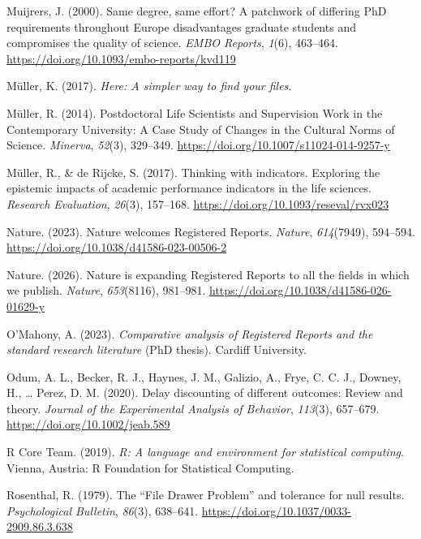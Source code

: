 \documentclass[
  british,
  a4paper,
  ,man,floatsintext]{apa6}
\newlength{\cslhangindent}
\newenvironment{CSLReferences}[2] %
 {\begin{list}{}{%
  \setlength{\itemindent}{0pt}
  \setlength{\leftmargin}{0pt}
  \setlength{\parsep}{0pt}
  \ifodd #1
   \setlength{\leftmargin}{\cslhangindent}
   \setlength{\itemindent}{-1\cslhangindent}
  \fi
  \setlength{\itemsep}{#2\baselineskip}}}
 {\end{list}}
\begin{document}
\begin{CSLReferences}{1}{0}
Muijrers, J. (2000). Same degree, same effort? {A} patchwork of differing {PhD} requirements throughout {Europe} disadvantages graduate students and compromises the quality of science. \emph{EMBO Reports}, \emph{1}(6), 463--464. \url{https://doi.org/10.1093/embo-reports/kvd119}

Müller, K. (2017). \emph{Here: {A} simpler way to find your files}.

Müller, R. (2014). Postdoctoral {Life Scientists} and {Supervision Work} in the {Contemporary University}: {A Case Study} of {Changes} in the {Cultural Norms} of {Science}. \emph{Minerva}, \emph{52}(3), 329--349. \url{https://doi.org/10.1007/s11024-014-9257-y}

Müller, R., \& de Rijcke, S. (2017). Thinking with indicators. {Exploring} the epistemic impacts of academic performance indicators in the life sciences. \emph{Research Evaluation}, \emph{26}(3), 157--168. \url{https://doi.org/10.1093/reseval/rvx023}

Nature. (2023). Nature welcomes {Registered Reports}. \emph{Nature}, \emph{614}(7949), 594--594. \url{https://doi.org/10.1038/d41586-023-00506-2}

Nature. (2026). Nature is expanding {Registered Reports} to all the fields in which we publish. \emph{Nature}, \emph{653}(8116), 981--981. \url{https://doi.org/10.1038/d41586-026-01629-y}

O'Mahony, A. (2023). \emph{Comparative analysis of {Registered Reports} and the standard research literature} (PhD thesis). Cardiff University.

Odum, A. L., Becker, R. J., Haynes, J. M., Galizio, A., Frye, C. C. J., Downey, H., \ldots{} Perez, D. M. (2020). Delay discounting of different outcomes: {Review} and theory. \emph{Journal of the Experimental Analysis of Behavior}, \emph{113}(3), 657--679. \url{https://doi.org/10.1002/jeab.589}

R Core Team. (2019). \emph{R: {A} language and environment for statistical computing}. Vienna, Austria: R Foundation for Statistical Computing.

Rosenthal, R. (1979). The {``{File Drawer Problem}''} and tolerance for null results. \emph{Psychological Bulletin}, \emph{86}(3), 638--641. \url{https://doi.org/10.1037/0033-2909.86.3.638}


\end{CSLReferences}
\end{document}
